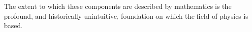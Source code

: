 
The extent to which these components are described by mathematics is the profound, and historically unintuitive, foundation on which the field of physics is based.





